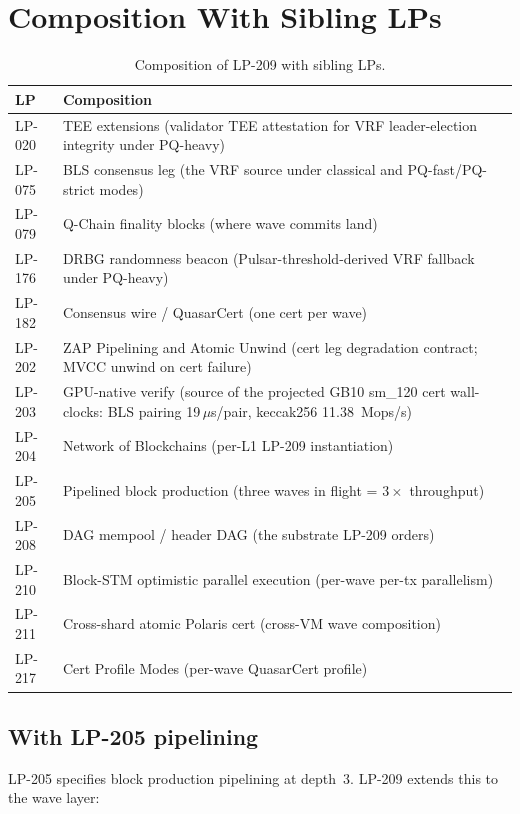 \section{Composition With Sibling LPs}

\begin{table}[h]
\centering
\small
\begin{tabular}{@{}lp{9cm}@{}}
\toprule
\textbf{LP} & \textbf{Composition} \\
\midrule
LP-020 & TEE extensions (validator TEE attestation for VRF leader-election integrity under PQ-heavy) \\
LP-075 & BLS consensus leg (the VRF source under classical and PQ-fast/PQ-strict modes) \\
LP-079 & Q-Chain finality blocks (where wave commits land) \\
LP-176 & DRBG randomness beacon (Pulsar-threshold-derived VRF fallback under PQ-heavy) \\
LP-182 & Consensus wire / QuasarCert (one cert per wave) \\
LP-202 & ZAP Pipelining and Atomic Unwind (cert leg degradation contract; MVCC unwind on cert failure) \\
LP-203 & GPU-native verify (source of the projected GB10 sm\_120 cert wall-clocks: BLS pairing 19\,$\mu$s/pair, keccak256 \SI{11.38}{\mega ops/s}) \\
LP-204 & Network of Blockchains (per-L1 LP-209 instantiation) \\
LP-205 & Pipelined block production (three waves in flight = $3\times$ throughput) \\
LP-208 & DAG mempool / header DAG (the substrate LP-209 orders) \\
LP-210 & Block-STM optimistic parallel execution (per-wave per-tx parallelism) \\
LP-211 & Cross-shard atomic Polaris cert (cross-VM wave composition) \\
LP-217 & Cert Profile Modes (per-wave QuasarCert profile) \\
\bottomrule
\end{tabular}
\caption{Composition of LP-209 with sibling LPs.}
\label{tab:composition}
\end{table}

\subsection{With LP-205 pipelining}

LP-205 specifies block production pipelining at depth~$3$. LP-209
extends this to the wave layer:

